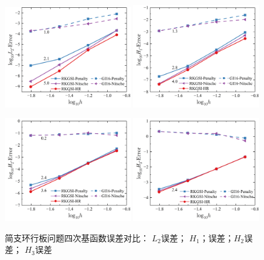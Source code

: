 \begin{figure}[H]
    \centering
    \begin{subcaptiongroup}
    \includegraphics[width=0.49\textwidth]{figure/PHR/A/QL2.png}
    \label{QL2}
    \includegraphics[width=0.49\textwidth]{figure/PHR/A/QH1.png}
    \label{QH1}
    \end{subcaptiongroup}
    \begin{subcaptiongroup}
    \includegraphics[width=0.49\textwidth]{figure/PHR/A/QH2.png}
    \label{QH2}
    \includegraphics[width=0.49\textwidth]{figure/PHR/A/QH3.png}
    \label{QH3}
    \end{subcaptiongroup}
\caption{简支环行板问题四次基函数误差对比： $L_2$误差； $H_1$；误差；$H_2$误差； $H_3$误差}
\label{AQLH}
\end{figure}
